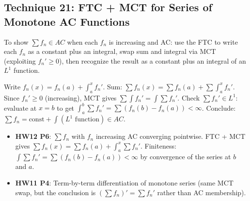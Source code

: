 \documentclass[11pt]{report}
\begin{document}
\subsection{Technique 21: FTC + MCT for Series of Monotone AC Functions}

To show $\sum f_n \in AC$ when each $f_n$ is increasing and AC: use the FTC to write each $f_n$ as a constant plus an integral, swap sum and integral via MCT (exploiting $f_n' \geq 0$), then recognize the result as a constant plus an integral of an $L^1$ function.

\begin{rembox}[Strategy]
Write $f_n(x) = f_n(a) + \int_a^x f_n'$. Sum: $\sum f_n(x) = \sum f_n(a) + \sum \int_a^x f_n'$. Since $f_n' \geq 0$ (increasing), MCT gives $\sum \int f_n' = \int \sum f_n'$. Check $\sum f_n' \in L^1$: evaluate at $x = b$ to get $\int_a^b \sum f_n' = \sum(f_n(b) - f_n(a)) < \infty$. Conclude: $\sum f_n = \text{const} + \int(\text{$L^1$ function}) \in AC$.
\end{rembox}

\begin{exbox}
\begin{itemize}
\item \textbf{HW12 P6}: $\sum f_n$ with $f_n$ increasing AC converging pointwise. FTC + MCT gives $\sum f_n(x) = \sum f_n(a) + \int_a^x \sum f_n'$. Finiteness: $\int \sum f_n' = \sum(f_n(b) - f_n(a)) < \infty$ by convergence of the series at $b$ and $a$.
\item \textbf{HW11 P4}: Term-by-term differentiation of monotone series (same MCT swap, but the conclusion is $(\sum f_n)' = \sum f_n'$ rather than AC membership).
\end{itemize}
\end{exbox}
\end{document}
